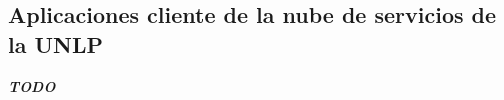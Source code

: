 \subsection{Aplicaciones cliente de la nube de servicios de la UNLP}\label{anexo:detalle-clientes}

\textbf{\textit{TODO}}
